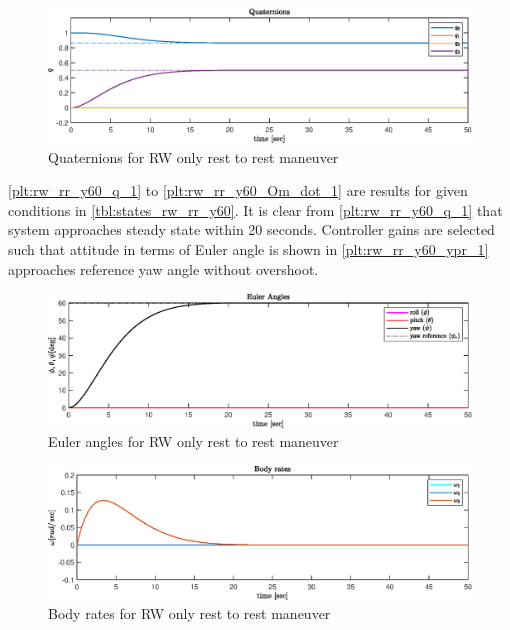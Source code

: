 \begin{figure}[H]
     \centering
    \includegraphics[width=1.0\columnwidth]{figures/plots/RW/rw_rr_y60_q.eps}
    \caption{Quaternions for RW only rest to rest maneuver}
    \label{plt:rw_rr_y60_q_1}
\end{figure}
\noindent \autoref{plt:rw_rr_y60_q_1} to \autoref{plt:rw_rr_y60_Om_dot_1} are results
for given conditions in \autoref{tbl:states_rw_rr_y60}. It is clear from \autoref{plt:rw_rr_y60_q_1} that system approaches steady state within 20 seconds. Controller gains are selected such that attitude in terms of Euler angle is shown in \autoref{plt:rw_rr_y60_ypr_1} approaches reference yaw angle without overshoot.
\begin{figure}[H]
    \centering
    \includegraphics[width=0.9\columnwidth]{figures/plots/RW/rw_rr_y60_ypr.eps}
    \caption{Euler angles for RW only rest to rest maneuver}
    \label{plt:rw_rr_y60_ypr_1}
\end{figure}

\begin{figure}[H]
    \centering
    \includegraphics[width=0.9\columnwidth]{figures/plots/RW/rw_rr_y60_w.eps}
    \caption{Body rates for RW only rest to rest maneuver}
    \label{plt:rw_rr_y60_w_1}
\end{figure}

